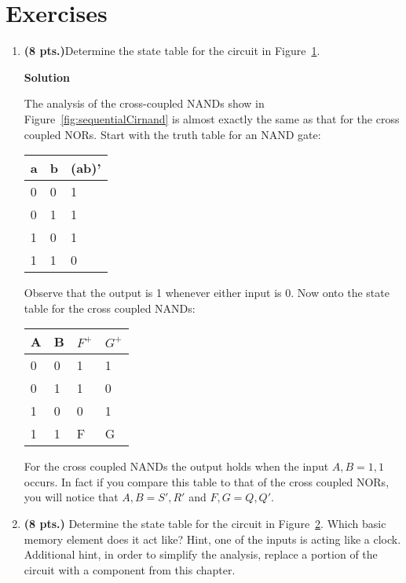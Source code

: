 \section{Exercises}
\label{section:sequentialCircuitsExercises}
\graphicspath{ {./chapter05/FigHw} }

\begin{enumerate}

\item \textbf{ (8 pts.)}Determine the state table for the circuit in Figure~\ref{fig:sequentialCirNANDs}.
\begin{figure}[ht]
\caption{}
\label{fig:sequentialCirNANDs}
\end{figure}


\begin{onlysolution}  \textbf{Solution} \itshape{
The analysis of the cross-coupled NANDs show in Figure~\ref{fig:sequentialCirnand} is
almost exactly the same as that for the cross coupled NORs.  Start with
the truth table for an NAND gate:

\begin{tabular}{l|l||l}
a & b & (ab)' \\ \hline
0 & 0 & 1 \\ \hline
0 & 1 & 1 \\ \hline
1 & 0 & 1 \\ \hline
1 & 1 & 0 \\ 
\end{tabular}

Observe that the output is 1 whenever
either input is 0.  Now onto the state table for the cross coupled NANDs:

\begin{tabular}{l|l||l|l}
A & B & $F^+$ & $G^+$ \\ \hline
0 & 0 & 1 & 1 \\ \hline
0 & 1 & 1 & 0 \\ \hline
1 & 0 & 0 & 1 \\ \hline
1 & 1 & F & G \\ 
\end{tabular}

For the cross coupled NANDs the output holds when the input $A,B=1,1$ occurs.
In fact if you compare this table to that of the cross coupled NORs, you will
notice that $A,B = S',R'$ and $F,G = Q,Q'$.
} \end{onlysolution} 

\item \textbf{ (8 pts.)} Determine the state table for the circuit 
in Figure~\ref{fig:sequentialCirDLatch}.  Which basic memory element does it act 
like?  Hint, one of the inputs is acting like a clock.  Additional
hint, in order to simplify the analysis, replace a portion of the 
circuit with a component from this chapter.
\begin{figure}[ht]
\caption{}
\label{fig:sequentialCirDLatch}
\end{figure}


\end{enumerate}
